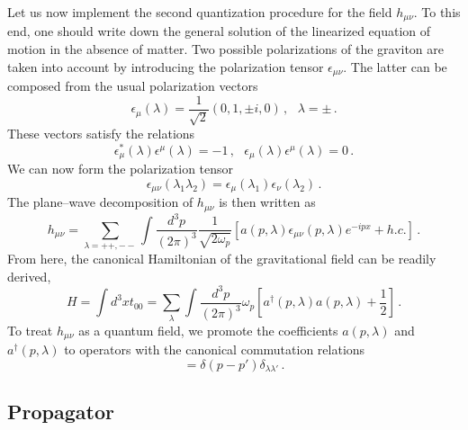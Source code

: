 \documentclass[11pt,a4paper]{article}
\begin{document}
Let us now implement the second quantization procedure for the field $h_{\mu\nu}$. To this end, one should write down the general solution of the linearized equation of motion in the absence of matter. Two possible polarizations of the graviton are taken into account by introducing the polarization tensor $\epsilon_{\mu\nu}$. The latter can be composed from the usual polarization vectors
\begin{equation}
\epsilon_\mu(\lambda)=\dfrac{1}{\sqrt{2}}(0,1,\pm i, 0) \,,~~~\lambda=\pm \,.
\end{equation}
These vectors satisfy the relations
\begin{equation}
\epsilon^*_\mu(\lambda)\epsilon^\mu(\lambda)=-1 \,,~~~\epsilon_\mu(\lambda)\epsilon^\mu(\lambda)=0 \,.
\end{equation}
We can now form the polarization tensor
\begin{equation}
\epsilon_{\mu\nu}(\lambda_1\lambda_2)=\epsilon_\mu(\lambda_1)\epsilon_\nu(\lambda_2) \,.
\end{equation}
The plane--wave decomposition of $h_{\mu\nu}$ is then written as
\begin{equation}
 h_{\mu\nu}=\sum_{\lambda=++,--}\int\dfrac{d^3p}{(2\pi)^3}\dfrac{1}{\sqrt{2\omega_p}}\left[a(p,\lambda)\epsilon_{\mu\nu}(p,\lambda)e^{-ipx}+h.c.\right] \,.
\end{equation}
From here, the canonical Hamiltonian of the gravitational field can be readily derived,
\begin{equation}
H=\int d^3x t_{00}=\sum_{\lambda}\int\dfrac{d^3p}{(2\pi)^3}\omega_p\left[a^\dag(p,\lambda)a(p,\lambda)+\dfrac{1}{2}\right] \,.
\end{equation}
To treat $h_{\mu\nu}$ as a quantum field, we promote the coefficients $a(p,\lambda)$ and $a^\dag(p,\lambda)$ to operators with the canonical commutation relations
\begin{equation}
[a(p,\lambda),a^\dag(p',\lambda')]=\delta(p-p')\delta_{\lambda\lambda'} \,.
\end{equation}

\subsection{Propagator}
\end{document}
